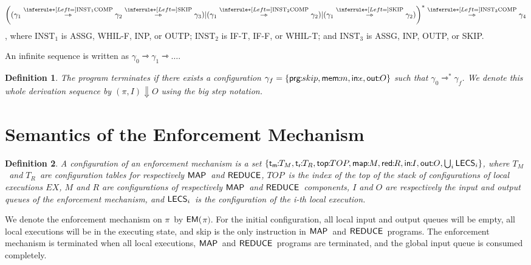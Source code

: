 \documentclass[10pt,a4paper,oneside]{article}
\newtheorem{definition}{Definition}[section]
\def\execution#1#2#3{\ensuremath{(#1, #2)\Downarrow#3}}
\def\TAV{\ensuremath{T_{M}}}
\def\TPV{\ensuremath{T_{R}}}
\def\ST{{\ensuremath{EX}}}
\def\TOP{\ensuremath{TOP}}
\def\lcomma{\ensuremath{\!\!:\!\!}}
\def\sanserif#1{\ensuremath{\sf #1}}
\def\REDUCE{\ensuremath{\sanserif{REDUCE}}}
\def\MAP{\ensuremath{\sanserif{MAP}}}
\def\gconf{\ensuremath{\gamma}}
\def\emptyQ{\ensuremath{\epsilon}}
\def\EM{\ensuremath{{\sanserif{EM}}}}
\def\Prog{\ensuremath{\pi}}
\def\EMP{\ensuremath{\EM(}\ensuremath{\Prog)}}
\def\EmptyRule#1#2{\ensuremath{\inferrule*[Left={}]{#1}{#2}}}
\def\RASSG{ASSG}
\def\RCOMP{COMP}
\def\RIFT{IF-T}
\def\RIFF{IF-F}
\def\RWHILET{WHIL-T}
\def\RWHILEF{WHIL-F}
\def\RSKIP{SKIP}
\def\RINPUT{INP}
\def\ROUTPUT{OUTP}
\def\NSKIP{skip}
\def\lprog{{\sf prg}}
\def\lmem{{\sf mem}}
\def\linput{{\sf in}}
\def\loutput{{\sf out}}
\def\ltav{\ensuremath{{\sf t_{m}}}}
\def\ltpv{\ensuremath{{\sf t_{r}}}}
\def\ltop{{\sf top}}
\def\LECS{{\sf \ensuremath{LECS}}}
\def\LECSI{\ensuremath{\LECS_{i}}}
\def\LECSUIR#1#2{\ensuremath{\bigcup_{#1}#2}}
\def\lmap{{\sf map}}
\def\lreduce{{\sf red}}
\def\CMAP{{\ensuremath{M}}}
\def\CREDUCE{{\ensuremath{R}}}
\begin{document}
\begin{equation*} \label{conf:transition}
\left((\gconf_1 \overset{\EmptyRule{\text{INST}_1}{\text{COMP}}}{\rightarrowtriangle} \gconf_2 \overset{\EmptyRule{}{\text{\RSKIP}}}{ \rightarrowtriangle} \gconf_3)|(\gconf_1 \overset{\EmptyRule{\text{INST}_2}{\text{COMP}}}{\rightarrowtriangle} \gconf_2)|(\gconf_1 \overset{\EmptyRule{}{\text{\RSKIP}}}{\rightarrowtriangle} \gconf_2)\right)^* \overset{\EmptyRule{\text{INST}_3}{\text{\RCOMP}}}{\rightarrowtriangle} \gconf_4
\end{equation*}, where  $\text{INST}_1$ is \RASSG, \RWHILEF, \RINPUT, or \ROUTPUT; $\text{INST}_2$ is \RIFT, \RIFF, or \RWHILET; and $\text{INST}_3$ is \RASSG, \RINPUT, \ROUTPUT, or \RSKIP.



An infinite sequence is written as $\gconf_0 \rightarrowtriangle \gconf_1 \rightarrowtriangle \dots$.

\begin{definition}\label{def:termination}
The program \emph{terminates} if there exists a configuration $\gconf_f = \{ \lprog \lcomma \NSKIP, \lmem\lcomma m, \linput\lcomma \emptyQ, \loutput\lcomma O \}$ such that $\gconf_0 \rightarrowtriangle^* \gconf_f$. We denote this whole derivation sequence by $\execution{\Prog}{I}{O}$ using the big step notation.
\end{definition}


\section{Semantics of the Enforcement Mechanism}\label{sec:formalization:em}
\begin{definition}\label{def:sem:global}
A \emph{configuration of an enforcement mechanism} is a set $\{\ltav\lcomma\TAV, \ltpv\lcomma\TPV, \ltop\lcomma\TOP, \lmap\lcomma\CMAP, \lreduce\lcomma\CREDUCE, \linput\lcomma I, \loutput\lcomma O, \LECSUIR{i}{\LECSI}\}$, where \TAV\ and \TPV\ are configuration tables for respectively \MAP\ and \REDUCE, \TOP\ is the index of the top of the stack of configurations of local executions \ST, $\CMAP$ and $\CREDUCE$ are configurations of respectively \MAP\ and \REDUCE\ components, $I$ and $O$ are respectively the input and output queues of the enforcement mechanism, and \LECSI\ is the configuration of the i-th local execution.
\end{definition}





We denote the enforcement mechanism on \Prog\ by \EMP. For the initial configuration, all local input and output queues will be empty, all local executions will be in the executing state, and skip is the only instruction in \MAP\ and \REDUCE\ programs. The enforcement mechanism is terminated when all local executions, \MAP\ and \REDUCE\ programs are terminated, and the global input queue is consumed completely.
\end{document}
